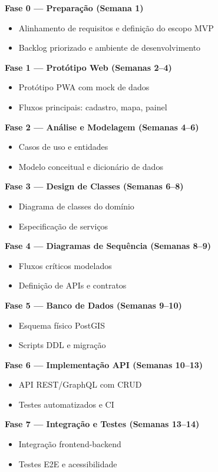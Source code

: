 \documentclass[12pt,a4paper]{article}
\begin{document}
\textbf{Fase 0 — Preparação (Semana 1)}
\begin{itemize}
    \item Alinhamento de requisitos e definição do escopo MVP
    \item Backlog priorizado e ambiente de desenvolvimento
\end{itemize}

\textbf{Fase 1 — Protótipo Web (Semanas 2–4)}
\begin{itemize}
    \item Protótipo PWA com mock de dados
    \item Fluxos principais: cadastro, mapa, painel
\end{itemize}

\textbf{Fase 2 — Análise e Modelagem (Semanas 4–6)}
\begin{itemize}
    \item Casos de uso e entidades
    \item Modelo conceitual e dicionário de dados
\end{itemize}

\textbf{Fase 3 — Design de Classes (Semanas 6–8)}
\begin{itemize}
    \item Diagrama de classes do domínio
    \item Especificação de serviços
\end{itemize}

\textbf{Fase 4 — Diagramas de Sequência (Semanas 8–9)}
\begin{itemize}
    \item Fluxos críticos modelados
    \item Definição de APIs e contratos
\end{itemize}

\textbf{Fase 5 — Banco de Dados (Semanas 9–10)}
\begin{itemize}
    \item Esquema físico PostGIS
    \item Scripts DDL e migração
\end{itemize}

\textbf{Fase 6 — Implementação API (Semanas 10–13)}
\begin{itemize}
    \item API REST/GraphQL com CRUD
    \item Testes automatizados e CI
\end{itemize}

\textbf{Fase 7 — Integração e Testes (Semanas 13–14)}
\begin{itemize}
    \item Integração frontend-backend
    \item Testes E2E e acessibilidade
\end{itemize}
\end{document}
